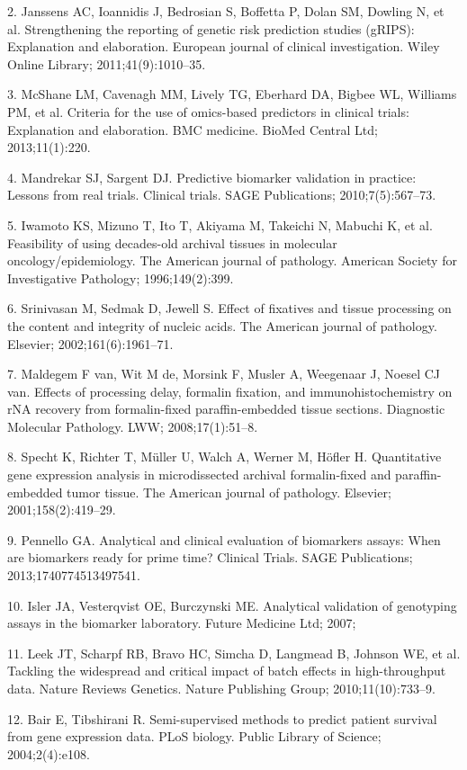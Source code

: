 \documentclass[11pt]{article}
\begin{document}
2. Janssens AC, Ioannidis J, Bedrosian S, Boffetta P, Dolan SM, Dowling
N, et al. Strengthening the reporting of genetic risk prediction studies
(gRIPS): Explanation and elaboration. European journal of clinical
investigation. Wiley Online Library; 2011;41(9):1010--35.

3. McShane LM, Cavenagh MM, Lively TG, Eberhard DA, Bigbee WL, Williams
PM, et al. Criteria for the use of omics-based predictors in clinical
trials: Explanation and elaboration. BMC medicine. BioMed Central Ltd;
2013;11(1):220.

4. Mandrekar SJ, Sargent DJ. Predictive biomarker validation in
practice: Lessons from real trials. Clinical trials. SAGE Publications;
2010;7(5):567--73.

5. Iwamoto KS, Mizuno T, Ito T, Akiyama M, Takeichi N, Mabuchi K, et al.
Feasibility of using decades-old archival tissues in molecular
oncology/epidemiology. The American journal of pathology. American
Society for Investigative Pathology; 1996;149(2):399.

6. Srinivasan M, Sedmak D, Jewell S. Effect of fixatives and tissue
processing on the content and integrity of nucleic acids. The American
journal of pathology. Elsevier; 2002;161(6):1961--71.

7. Maldegem F van, Wit M de, Morsink F, Musler A, Weegenaar J, Noesel CJ
van. Effects of processing delay, formalin fixation, and
immunohistochemistry on rNA recovery from formalin-fixed
paraffin-embedded tissue sections. Diagnostic Molecular Pathology. LWW;
2008;17(1):51--8.

8. Specht K, Richter T, M{ü}ller U, Walch A, Werner M, H{ö}fler H.
Quantitative gene expression analysis in microdissected archival
formalin-fixed and paraffin-embedded tumor tissue. The American journal
of pathology. Elsevier; 2001;158(2):419--29.

9. Pennello GA. Analytical and clinical evaluation of biomarkers assays:
When are biomarkers ready for prime time? Clinical Trials. SAGE
Publications; 2013;1740774513497541.

10. Isler JA, Vesterqvist OE, Burczynski ME. Analytical validation of
genotyping assays in the biomarker laboratory. Future Medicine Ltd;
2007;

11. Leek JT, Scharpf RB, Bravo HC, Simcha D, Langmead B, Johnson WE, et
al. Tackling the widespread and critical impact of batch effects in
high-throughput data. Nature Reviews Genetics. Nature Publishing Group;
2010;11(10):733--9.

12. Bair E, Tibshirani R. Semi-supervised methods to predict patient
survival from gene expression data. PLoS biology. Public Library of
Science; 2004;2(4):e108.
\end{document}
